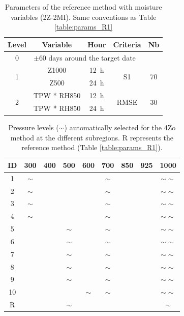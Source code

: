 \documentclass[review]{elsarticle}
\begin{document}
\begin{table}[t]
	\caption{Parameters of the reference method with moisture variables (2Z-2MI). Same conventions as Table \ref{table:params_R1}}
	\footnotesize
	\begin{center}
		\begin{tabular}{ccccc}
			\hline 
			Level & Variable & Hour & Criteria & Nb \\ 
			\hline 
			0 & \multicolumn{4}{l}{$\pm 60$ days around the target date} \\
			\hline 
			\multirow{2}{*}{1} & Z1000 & 12~h & \multirow{2}{*}{S1} & \multirow{2}{*}{70} \\
			& Z500 & 24~h & & \\ 
			\hline
			\multirow{2}{*}{2} & TPW * RH850 & 12~h & \multirow{2}{*}{RMSE} & \multirow{2}{*}{30} \\
			& TPW * RH850 & 24~h & & \\ 
			\hline 
		\end{tabular} 
	\end{center}
	\label{table:params_R2}
\end{table}

\begin{table}[t]
	\caption{Pressure levels ($\sim$) automatically selected for the 4Zo method at the different subregions. R represents the reference method (Table \ref{table:params_R1}).}
	\footnotesize
	\begin{center}
		\begin{tabular}{ccccccccc}
			\hline ID & 300 & 400 & 500 & 600 & 700 & 850 & 925 & 1000 \\ 
			\hline 
			1  & $\sim$ &   &   &   & $\sim$ &   &   & $\sim \sim$ \\
			2  & $\sim$ &   &   &   & $\sim$ &   &   & $\sim \sim$ \\
			3  & $\sim$ &   &   &   & $\sim$ &   &   & $\sim \sim$ \\
			4  & $\sim$ &   &   &   & $\sim$ &   &   & $\sim \sim$ \\
			5  &   &   & $\sim$ &   & $\sim$ &   &   & $\sim \sim$ \\
			6  &   &   & $\sim$ &   & $\sim$ &   &   & $\sim \sim$ \\
			7  &   &   & $\sim$ &   & $\sim$ &   &   & $\sim \sim$ \\
			8  &   &   & $\sim$ &   & $\sim$ &   &   & $\sim \sim$ \\
			9  &   &   & $\sim$ &   & $\sim$ &   &   & $\sim \sim$ \\
			10 &   &   &   & $\sim$ & $\sim$ &   &   & $\sim \sim$ \\
			\hline 	
			R  &   &   & $\sim$ &   &   &   &   & $\sim$ \\
			\hline 
		\end{tabular} 
	\end{center}
	\label{table:levels_GA_4Zo}
\end{table}
\end{document}
